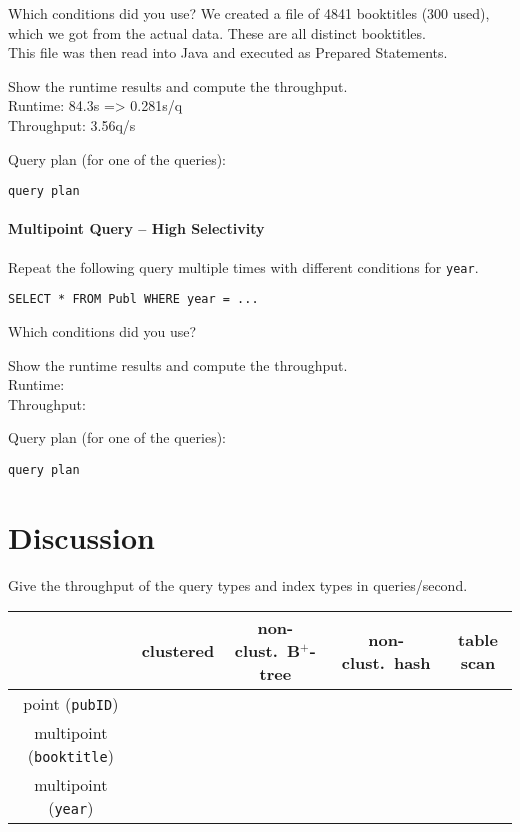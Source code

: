 \documentclass[11pt]{scrartcl}
\begin{document}
\noindent
Which conditions did you use?
We created a file of 4841 booktitles (300 used), which we got from the actual data. These are all distinct booktitles.\\
This file was then read into Java and executed as Prepared Statements.

\smallskip\noindent
Show the runtime results and compute the throughput.\\
Runtime: 84.3s => 0.281s/q\\
Throughput: 3.56q/s

\smallskip\noindent
Query plan (for one of the queries):
{\small
\begin{verbatim}
query plan
\end{verbatim}
}


\paragraph{Multipoint Query -- High Selectivity}

Repeat the following query multiple times with different conditions for {\tt year}.

{\small
\begin{verbatim}
SELECT * FROM Publ WHERE year = ...
\end{verbatim}
}

\noindent
Which conditions did you use?

\smallskip\noindent
Show the runtime results and compute the throughput.\\
Runtime: \\
Throughput: 


\smallskip\noindent
Query plan (for one of the queries):
{\small
\begin{verbatim}
query plan
\end{verbatim}
}

\section{Discussion}

Give the throughput of the query types and index types in queries/second.
\begin{center}
  \begin{tabular}{c|c|c|c|c}
    & clustered & non-clust.\ B$^+$-tree & non-clust.\ hash & table scan \\
    \hline
    point ({\tt pubID}) & & & \\
    \hline
    multipoint ({\tt booktitle}) & & & \\
    \hline
    multipoint  ({\tt year}) & & & \\  
  \end{tabular}
\end{center}
\end{document}
